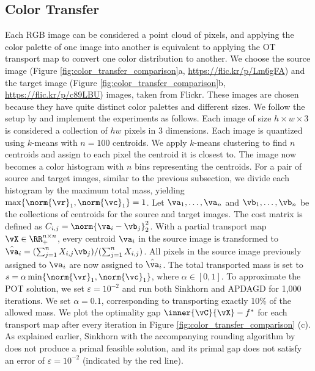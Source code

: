 \subsection{Color Transfer}
Each RGB image can be considered a point cloud of pixels, and applying the color palette of one image into another is equivalent to applying the OT transport map to convert one color distribution to another. We choose the source image (Figure \ref{fig:color_transfer_comparison}a, \url{https://flic.kr/p/Lm6gFA}) and the target image (Figure \ref{fig:color_transfer_comparison}b, \url{https://flic.kr/p/c89LBU}) images, taken from Flickr. These images are chosen because they have quite distinct color palettes and different sizes. We follow the setup by \citep{Blondel-2018-Smooth} and implement the experiments as follows. Each image of size $h \times w \times 3$ is considered a collection of $hw$ pixels in 3 dimensions. Each image is quantized using $k$-means with $n = 100$ centroids. We apply $k$-means clustering to find $n$ centroids and assign to each pixel the centroid it is closest to. The image now becomes a color histogram with $n$ bins representing the centroids. For a pair of source and target images, similar to the previous subsection, we divide each histogram by the maximum total mass, yielding $\max\{\norm{\vr}_1, \norm{\vc}_1\} = 1$. Let $\va_1, \ldots, \va_n$ and $\vb_1, \ldots, \vb_n$ be the collections of centroids for the source and target images. The cost matrix is defined as $C_{i, j} = \norm{\va_i - \vb_j}_2^2$. With a partial transport map $\vX \in \RR_{+}^{n \times n}$, every centroid $\va_i$ in the source image is transformed to 
$\hat{\va}_i = (\sum_{j=1}^{n} X_{i, j} \vb_j) / (\sum_{j=1}^{n} X_{i, j})$. All pixels in the source image previously assigned to $\va_i$ are now assigned to $\hat{\va}_i$. The total transported mass is set to $s = \alpha \min \{\norm{\vr}_1, \norm{\vc}_1\}$, where $\alpha \in [0, 1]$. To approximate the POT solution, we set $\varepsilon = 10^{-2}$ and run both Sinkhorn \cite{nhatho-mmpot} and APDAGD for 1,000 iterations. We set $\alpha = 0.1$, corresponding to transporting exactly 10\% of the allowed mass.
We plot the optimality gap $\inner{\vC}{\vX} - f^*$ for each transport map after every iteration in Figure \ref{fig:color_transfer_comparison} (c). As explained earlier, Sinkhorn with the accompanying rounding algorithm by \citep{altschuler2017near} does not produce a primal feasible solution, and its primal gap does not satisfy an error of $\varepsilon = 10^{-2}$ (indicated by the red line).

